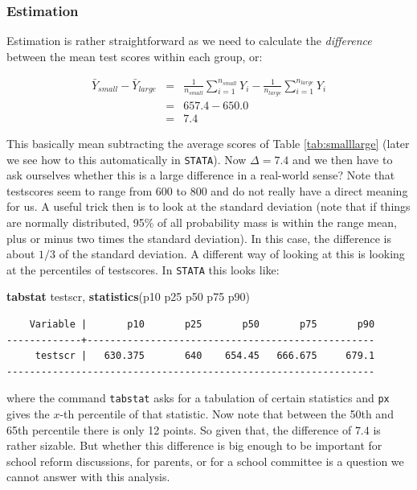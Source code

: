 \documentclass[
]{book}
\newenvironment{Shaded}{\begin{snugshade}}{\end{snugshade}}
\newcommand{\KeywordTok}[1]{\textcolor[rgb]{0.13,0.29,0.53}{\textbf{#1}}}
\newcommand{\NormalTok}[1]{#1}
\begin{document}
\hypertarget{estimation}{%
\subsubsection{Estimation}\label{estimation}}

Estimation is rather straightforward as we need to calculate the \emph{difference} between the mean test scores within each group, or:

\begin{eqnarray}
\bar{Y}_{small} - \bar{Y}_{large} &=& \frac{1}{n_{small}} \sum_{i=1}^{n_{small}}Y_i - \frac{1}{n_{large}} \sum_{i=1}^{n_{large}} Y_i \\
&=& 657.4-650.0\\
&=&7.4
\label{eq:estimationlarge}
\end{eqnarray}

This basically mean subtracting the average scores of Table \ref{tab:smalllarge} (later we see how to this automatically in \texttt{STATA}). Now \(\Delta = 7.4\) and we then have to ask ourselves whether this is a large difference in a real-world sense? Note that testscores seem to range from 600 to 800 and do not really have a direct meaning for us. A useful trick then is to look at the standard deviation (note that if things are normally distributed, 95\% of all probability mass is within the range mean, plus or minus two times the standard deviation). In this case, the difference is about \(1/3\) of the standard deviation. A different way of looking at this is looking at the percentiles of testscores. In \texttt{STATA} this looks like:

\begin{Shaded}
\begin{Highlighting}[]
\KeywordTok{tabstat}\NormalTok{ testscr, }\KeywordTok{statistics}\NormalTok{(p10 p25 p50 p75 p90)}
\end{Highlighting}
\end{Shaded}

\begin{verbatim}
    Variable |       p10       p25       p50       p75       p90
-------------+--------------------------------------------------
     testscr |   630.375       640    654.45   666.675     679.1
----------------------------------------------------------------
\end{verbatim}

where the command \texttt{tabstat} asks for a tabulation of certain statistics and \texttt{px} gives the \(x\)-th percentile of that statistic. Now note that between the 50th and 65th percentile there is only 12 points. So given that, the difference of \(7.4\) is rather sizable. But whether this difference is big enough to be important for school reform discussions, for parents, or for a school committee is a question we cannot answer with this analysis.
\end{document}
